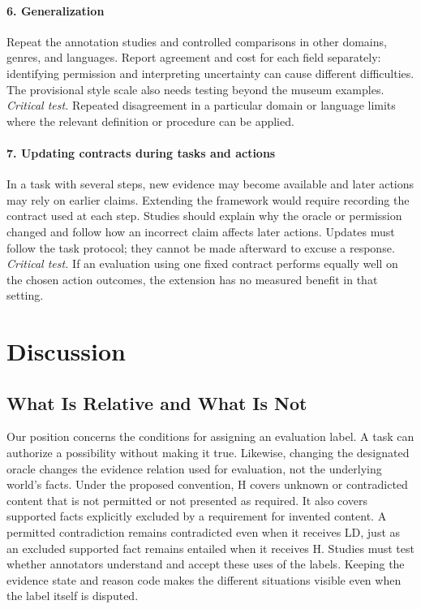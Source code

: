 \documentclass{clv2025}
\begin{document}
\paragraph{6. Generalization}
Repeat the annotation studies and controlled comparisons in other domains,
genres, and languages. Report agreement and cost for each field separately:
identifying permission and interpreting uncertainty can cause different
difficulties. The provisional style scale also needs testing beyond the
museum examples.
\emph{Critical test.} Repeated disagreement in a particular domain or
language limits where the relevant definition or procedure can be applied.

\paragraph{7. Updating contracts during tasks and actions}
In a task with several steps, new evidence may become available and later
actions may rely on earlier claims. Extending the framework would require
recording the contract used at each step. Studies should explain why the
oracle or permission changed and follow how an incorrect claim affects later
actions. Updates must follow the task protocol; they cannot be made afterward
to excuse a response.
\emph{Critical test.} If an evaluation using one fixed contract performs
equally well on the chosen action outcomes, the extension has no measured
benefit in that setting.

\section{Discussion}\label{sec:discussion}

\subsection{What Is Relative and What Is Not}\label{subsec:relative}

Our position concerns the conditions for assigning an evaluation label.
A task can authorize a possibility without making it true. Likewise,
changing the designated oracle changes the evidence relation used for
evaluation, not the underlying world's facts. Under the proposed convention,
H covers unknown or contradicted content that is not permitted or not presented
as required. It also covers supported facts explicitly excluded by a requirement
for invented content. A permitted contradiction remains contradicted even when
it receives LD, just as an excluded supported fact remains entailed when it
receives H. Studies must test whether annotators understand and accept these
uses of the labels. Keeping the evidence state and reason code makes the
different situations visible even when the label itself is disputed.
\end{document}

